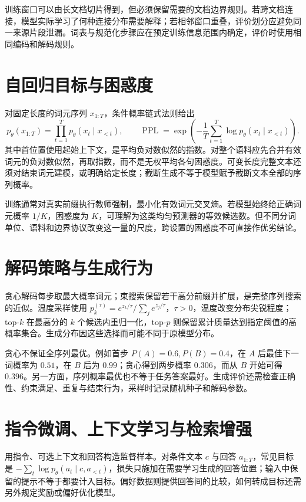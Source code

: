 \documentclass[UTF8,12pt,a4paper,fontset=fandol]{ctexbook}
\begin{document}
训练窗口可以由长文档切片得到，但必须保留需要的文档边界规则。若跨文档连接，模型实际学习了何种连接分布需要解释；若相邻窗口重叠，评价划分应避免同一来源片段泄漏。词表与规范化步骤应在预定训练信息范围内确定，评价时使用相同编码和解码规则。

\section{自回归目标与困惑度}
对固定长度的词元序列 $x_{1:T}$，条件概率链式法则给出
\begin{equation}
 p_\theta(x_{1:T})=\prod_{t=1}^Tp_\theta(x_t\mid x_{<t}),\qquad
 \operatorname{PPL}=\exp\!\left(-\frac1T\sum_{t=1}^T\log p_\theta(x_t\mid x_{<t})\right).
\label{eq:dl-language-probability}
\end{equation}
其中首位置使用起始上下文，是平均负对数似然的指数。对整个语料应先合并有效词元的负对数似然，再取指数，而不是无权平均各句困惑度。可变长度完整文本还须对结束词元建模，或明确给定长度；截断生成不等于模型赋予截断文本全部的序列概率。

训练通常对真实前缀执行教师强制，最小化有效词元交叉熵。若模型始终给正确词元概率 $1/K$，困惑度为 $K$，可理解为这类均匀预测器的等效候选数。但不同分词单位、语料和边界协议改变这一量的尺度，跨设置的困惑度不可直接作优劣结论。

\section{解码策略与生成行为}
贪心解码每步取最大概率词元；束搜索保留若干高分前缀并扩展，是完整序列搜索的近似。温度采样使用 $p_k^{(\tau)}=e^{z_k/\tau}/\sum_je^{z_j/\tau}$，$\tau>0$，温度改变分布尖锐程度；top-$k$ 在最高分的 $k$ 个候选内重归一化，top-$p$ 则保留累计质量达到指定阈值的高概率集合。生成分布因这些选择而可能不同于原模型分布。

贪心不保证全序列最优。例如首步 $P(A)=0.6,P(B)=0.4$，在 $A$ 后最佳下一词概率为 $0.51$，在 $B$ 后为 $0.99$；贪心得到两步概率 $0.306$，而从 $B$ 开始可得 $0.396$。另一方面，序列概率最优也不等于任务答案最好。生成评价还需检查正确性、约束满足、重复与结束行为，采样时记录随机种子和解码参数。

\section{指令微调、上下文学习与检索增强}
用指令、可选上下文和回答构造监督样本。对条件文本 $c$ 与回答 $a_{1:T}$，常见目标是 $-\sum_t\log p_\theta(a_t\mid c,a_{<t})$，损失只施加在需要学习生成的回答位置；输入中保留的提示不等于都要计入目标。偏好数据则提供回答间的比较，如何转成目标还需另外规定奖励或偏好优化模型。
\end{document}
